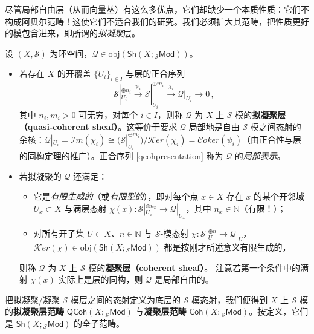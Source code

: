 尽管局部自由层（从而向量丛）有这么多优点，它们却缺少一个本质性质：它们不构成阿贝尔范畴！这使它们不适合我们的研究。我们必须扩大其范畴，把性质更好的模包含进来，即所谓的\textit{拟凝聚}层。

\begin{Def}\label{coherentonringed}
设 $(X,\mathcal{S})$ 为环空间，$\mathcal{Q}\in\text{obj}(\mathsf{Sh}(X;{}_\mathcal{S}\mathsf{Mod}))$。
\begin{itemize}[leftmargin=0.5cm]
	\item 若存在 $X$ 的开覆盖 $\{U_i\}_{i\in I}$ 与层的正合序列
	\begin{equation}\label{qcohpresentation}
		\mathcal{S}|_{U_i}^{\oplus n_i}\xrightarrow{\psi_i}\mathcal{S}|_{U_i}^{\oplus m_i}\xrightarrow{\chi_i}\mathcal{Q}|_{U_i}\rightarrow 0\,,
	\end{equation}
	其中 $n_i, m_i>0$ 可无穷，对每个 $i\in I$，则称 $\mathcal{Q}$ 为 $X$ 上 $\mathcal{S}$-模的\textbf{拟凝聚层（quasi-coherent sheaf）}。这等价于要求 $\mathcal{Q}$ 局部地是自由 $\mathcal{S}$-模之间态射的余核：$\mathcal{Q}|_{U_i}=\mathcal{I}m(\chi_i)\cong \big(\mathcal{S}|_{U_i}^{\oplus m_i}\big)/\mathcal{K}er(\chi_i)=\mathcal{C}oker(\psi_i)$（由正合性与层的同构定理的推广）。正合序列 \eqref{qcohpresentation} 称为 $\mathcal{Q}$ 的\textit{局部表示}。
	
	\item 若拟凝聚的 $\mathcal{Q}$ 还满足：
	\renewcommand{\labelitemii}{\textendash}
	\begin{itemize}[leftmargin=0.4cm]
		\item 它是\textit{有限生成的}（或\textit{有限型的}），即对每个点 $x\in X$ 存在 $x$ 的某个开邻域 $U_x\subset X$ 与满层态射 $\chi(x):\mathcal{S}|_{U_x}^{\oplus n_x}\rightarrow \mathcal{Q}|_{U_x}$，其中 $n_x\in\mathbb{N}$（有限！）；
		
		\item 对所有开子集 $U\subset X$、$n\in\mathbb{N}$ 与 $\mathcal{S}$-模态射 $\chi:\mathcal{S}|_U^{\oplus n}\rightarrow \mathcal{Q}|_U$，$\mathcal{K}er(\chi)\in\text{obj}(\mathsf{Sh}(X;{}_\mathcal{S}\mathsf{Mod}))$ 都是按刚才所述意义有限生成的，
	\end{itemize}	
	则称 $\mathcal{Q}$ 为 $X$ 上 $\mathcal{S}$-模的\textbf{凝聚层（coherent sheaf）}。
	注意若第一个条件中的满射 $\chi(x)$ 实际上是层的同构，则 $\mathcal{Q}$ 是局部自由的。
\end{itemize} 
把拟凝聚/凝聚 $\mathcal{S}$-模层之间的态射定义为底层的 $\mathcal{S}$-模态射，我们便得到 $X$ 上 $\mathcal{S}$-模的\textbf{拟凝聚层范畴} $\mathsf{QCoh}(X;{}_\mathcal{S}\mathsf{Mod})$ 与\textbf{凝聚层范畴} $\mathsf{Coh}(X;{}_\mathcal{S}\mathsf{Mod})$。按定义，它们是 $\mathsf{Sh}(X;{}_\mathcal{S}\mathsf{Mod})$ 的全子范畴。
\end{Def}

